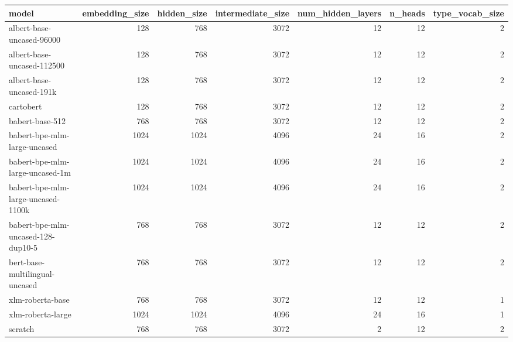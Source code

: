 \begin{tabular}{lrrrrrr}
\toprule
                             model &  embedding\_size &  hidden\_size &  intermediate\_size &  num\_hidden\_layers &  n\_heads &  type\_vocab\_size \\
\midrule
         albert-base-uncased-96000 &             128 &          768 &               3072 &                 12 &       12 &                2 \\
        albert-base-uncased-112500 &             128 &          768 &               3072 &                 12 &       12 &                2 \\
          albert-base-uncased-191k &             128 &          768 &               3072 &                 12 &       12 &                2 \\
                         cartobert &             128 &          768 &               3072 &                 12 &       12 &                2 \\
                   babert-base-512 &             768 &          768 &               3072 &                 12 &       12 &                2 \\
      babert-bpe-mlm-large-uncased &            1024 &         1024 &               4096 &                 24 &       16 &                2 \\
   babert-bpe-mlm-large-uncased-1m &            1024 &         1024 &               4096 &                 24 &       16 &                2 \\
babert-bpe-mlm-large-uncased-1100k &            1024 &         1024 &               4096 &                 24 &       16 &                2 \\
babert-bpe-mlm-uncased-128-dup10-5 &             768 &          768 &               3072 &                 12 &       12 &                2 \\
    bert-base-multilingual-uncased &             768 &          768 &               3072 &                 12 &       12 &                2 \\
                  xlm-roberta-base &             768 &          768 &               3072 &                 12 &       12 &                1 \\
                 xlm-roberta-large &            1024 &         1024 &               4096 &                 24 &       16 &                1 \\
                           scratch &             768 &          768 &               3072 &                  2 &       12 &                2 \\

\end{tabular}
